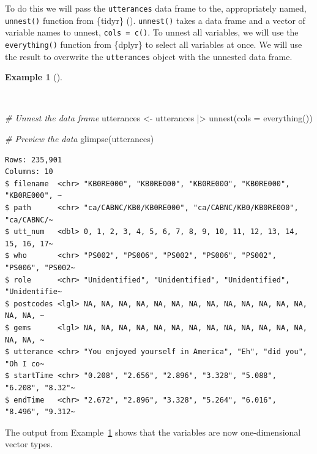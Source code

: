 \documentclass[
  letterpaper,
  krantz1]{latex/krantz-mod}
\newenvironment{Shaded}{\begin{snugshade}}{\end{snugshade}}
\newcommand{\AttributeTok}[1]{\textcolor[rgb]{0.00,0.00,0.00}{#1}}
\newcommand{\CommentTok}[1]{\textcolor[rgb]{0.00,0.00,0.00}{\textit{#1}}}
\newcommand{\FunctionTok}[1]{\textcolor[rgb]{0.00,0.00,0.00}{#1}}
\newcommand{\NormalTok}[1]{\textcolor[rgb]{0.00,0.00,0.00}{#1}}
\newcommand{\OtherTok}[1]{\textcolor[rgb]{0.00,0.00,0.00}{#1}}
\newcommand{\SpecialCharTok}[1]{\textcolor[rgb]{0.00,0.00,0.00}{#1}}
\theoremstyle{definition}
\newtheorem{example}{Example}[chapter]
\theoremstyle{definition}
\theoremstyle{remark}
\begin{document}
To do this we will pass the \texttt{utterances} data frame to the,
appropriately named, \texttt{unnest()} function from \{tidyr\}
().
\texttt{unnest()} takes a data frame and a vector of variable names to
unnest, \texttt{cols\ =\ c()}. To unnest all variables, we will use the
\texttt{everything()} function from \{dplyr\} to select all variables at
once. We will use the result to overwrite the \texttt{utterances} object
with the unnested data frame.

\begin{example}[]\protect\hypertarget{exm-acquire-unnest}{}\label{exm-acquire-unnest}

~

\begin{Shaded}
\begin{Highlighting}[numbers=left,,]
\CommentTok{\# Unnest the data frame}
\NormalTok{utterances }\OtherTok{\textless{}{-}}
\NormalTok{  utterances }\SpecialCharTok{|\textgreater{}}
  \FunctionTok{unnest}\NormalTok{(}\AttributeTok{cols =} \FunctionTok{everything}\NormalTok{())}

\CommentTok{\# Preview the data}
\FunctionTok{glimpse}\NormalTok{(utterances)}
\end{Highlighting}
\end{Shaded}

\begin{verbatim}
Rows: 235,901
Columns: 10
$ filename  <chr> "KB0RE000", "KB0RE000", "KB0RE000", "KB0RE000", "KB0RE000", ~
$ path      <chr> "ca/CABNC/KB0/KB0RE000", "ca/CABNC/KB0/KB0RE000", "ca/CABNC/~
$ utt_num   <dbl> 0, 1, 2, 3, 4, 5, 6, 7, 8, 9, 10, 11, 12, 13, 14, 15, 16, 17~
$ who       <chr> "PS002", "PS006", "PS002", "PS006", "PS002", "PS006", "PS002~
$ role      <chr> "Unidentified", "Unidentified", "Unidentified", "Unidentifie~
$ postcodes <lgl> NA, NA, NA, NA, NA, NA, NA, NA, NA, NA, NA, NA, NA, NA, NA, ~
$ gems      <lgl> NA, NA, NA, NA, NA, NA, NA, NA, NA, NA, NA, NA, NA, NA, NA, ~
$ utterance <chr> "You enjoyed yourself in America", "Eh", "did you", "Oh I co~
$ startTime <chr> "0.208", "2.656", "2.896", "3.328", "5.088", "6.208", "8.32"~
$ endTime   <chr> "2.672", "2.896", "3.328", "5.264", "6.016", "8.496", "9.312~
\end{verbatim}

\end{example}

The output from Example~\ref{exm-acquire-unnest} shows that the
variables are now one-dimensional vector types.
\end{document}
